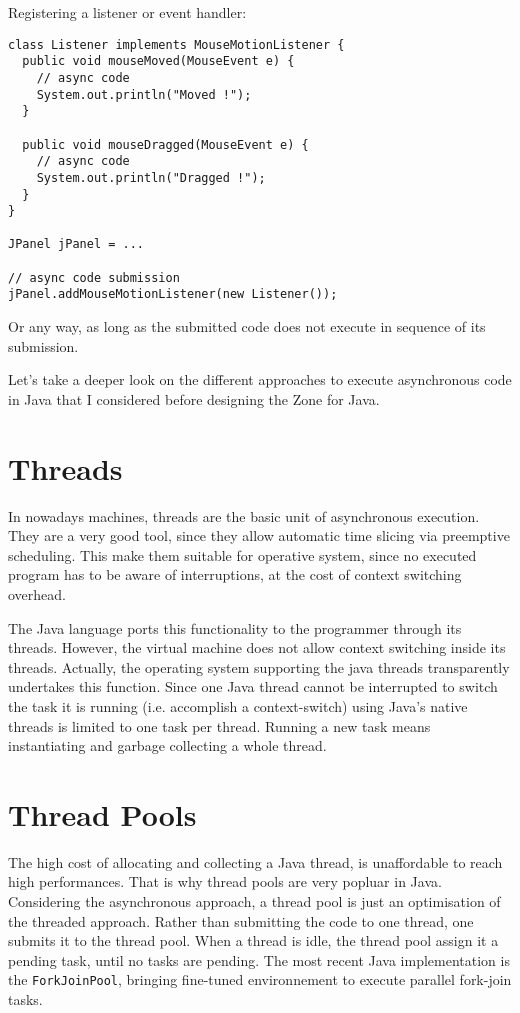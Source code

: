 Registering a listener or event handler:
\begin{lstlisting}
class Listener implements MouseMotionListener {
  public void mouseMoved(MouseEvent e) {
    // async code
    System.out.println("Moved !");
  }

  public void mouseDragged(MouseEvent e) {
    // async code
    System.out.println("Dragged !");
  }
}

JPanel jPanel = ...

// async code submission
jPanel.addMouseMotionListener(new Listener());
\end{lstlisting}

Or any way, as long as the submitted code does not execute in sequence of its submission.

Let's take a deeper look on the different approaches to execute asynchronous code in Java that I considered before designing the Zone for Java.


\section{Threads}

In nowadays machines, threads are the basic unit of asynchronous execution. They are a very good tool, since they allow automatic time slicing via preemptive scheduling. This make them suitable for operative system, since no executed program has to be aware of interruptions, at the cost of context switching overhead.

The Java language ports this functionality to the programmer through its threads. However, the virtual machine does not allow context switching inside its threads. Actually, the operating system supporting the java threads transparently undertakes this function. Since one Java thread cannot be interrupted to switch the task it is running (i.e. accomplish a context-switch) using Java's native threads is limited to one task per thread. Running a new task means instantiating and garbage collecting a whole thread.

\section{Thread Pools}

The high cost of allocating and collecting a Java thread, is unaffordable to reach high performances. That is why thread pools are very popluar in Java. Considering the asynchronous approach, a thread pool is just an optimisation of the threaded approach. Rather than submitting the code to one thread, one submits it to the thread pool. When a thread is idle, the thread pool assign it a pending task, until no tasks are pending. The most recent Java implementation is the \lstinline{ForkJoinPool}, bringing fine-tuned environnement to execute parallel fork-join tasks.

